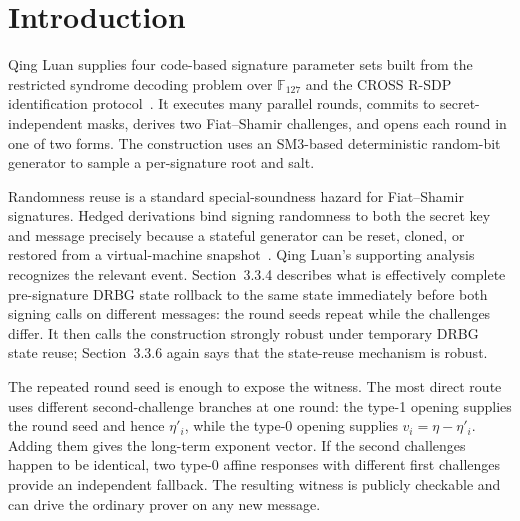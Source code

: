 \documentclass[11pt,a4paper]{article}
\newcommand{\F}{\mathbb F}
\begin{document}
\section{Introduction}

Qing Luan supplies four code-based signature parameter sets built from the
restricted syndrome decoding problem over $\F_{127}$ and the CROSS R-SDP
identification protocol~\cite{qingluan-spec,cross-rsdp}.  It executes many
parallel rounds, commits to secret-independent masks, derives two
Fiat--Shamir challenges, and opens each round in one of two forms.  The
construction uses an SM3-based deterministic random-bit generator to sample a
per-signature root and salt.

Randomness reuse is a standard special-soundness hazard for Fiat--Shamir
signatures.  Hedged derivations bind signing randomness to both the secret key
and message precisely because a stateful generator can be reset, cloned, or
restored from a virtual-machine snapshot~\cite{aranha-hedged}.  Qing Luan's
supporting analysis recognizes the relevant event.  Section~3.3.4 describes
what is effectively complete pre-signature DRBG state rollback to the same
state immediately before both signing calls on different messages: the round
seeds repeat while the challenges differ.  It then calls
the construction strongly robust under temporary DRBG state reuse;
Section~3.3.6 again says that the state-reuse mechanism is robust.

The repeated round seed is enough to expose the witness.  The most direct
route uses different second-challenge branches at one round: the type-1
opening supplies the round seed and hence $\eta'_i$, while the type-0 opening
supplies $v_i=\eta-\eta'_i$.  Adding them gives the long-term exponent vector.
If the second challenges happen to be identical, two type-0 affine responses
with different first challenges provide an independent fallback.  The
resulting witness is publicly checkable and can drive the ordinary prover on
any new message.
\end{document}

